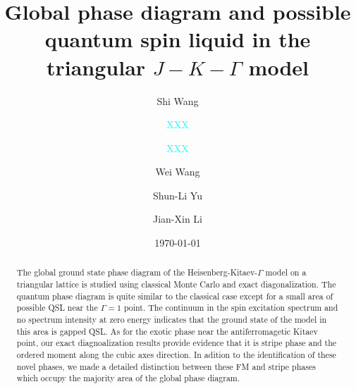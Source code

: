 \documentclass[aps,prb,reprint,amsfonts,amsmath,amssymb,showpacs,groupedaddress,superscriptaddress]{revtex4-1}
\begin{document}
\title{Global phase diagram and possible quantum spin liquid in the triangular $J-K-\Gamma$ model}

\author{Shi Wang}

\author{\textcolor{cyan}{XXX}}
\affiliation{\textcolor{cyan}{XXX}}

\author{\textcolor{cyan}{XXX}}
\affiliation{\textcolor{cyan}{XXX}}

\author{Wei Wang}

\author{Shun-Li Yu}

\author{Jian-Xin Li}

\date{\today}

\begin{abstract}
The global ground state phase diagram of the Heisenberg-Kitaev-$\Gamma$ model on a triangular lattice is studied using classical Monte Carlo and exact diagonalization. The quantum phase diagram is quite similar to the classical case except for a small area of possible QSL near the $\Gamma=1$ point. The continuum in the spin excitation spectrum and no spectrum intensity at zero energy indicates that the ground state of the model in this area is gapped QSL. As for the exotic phase near the antiferromagetic Kitaev point, our exact diagnoalization results provide evidence that it is stripe phase and the ordered moment along the cubic axes direction. In adition to the identification of these novel phases, we made a detailed distinction between these FM and stripe phases which occupy the majority area of the global phase diagram.
\end{abstract}

\maketitle
\end{document}
